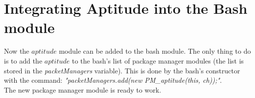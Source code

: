 \section{Integrating Aptitude into the Bash module}\label{sec:aptitude_int}
Now the $aptitude$ module can be added to the bash module.
The only thing to do is to add the $aptitude$ to the bash's list of package manager modules (the list is stored in the \emph{packetManagers} variable).
This is done by the bash's constructor with the command: \emph{"packetManagers.add(new PM\_aptitude(this, ch));"}.\\
The new package manager module is ready to work.